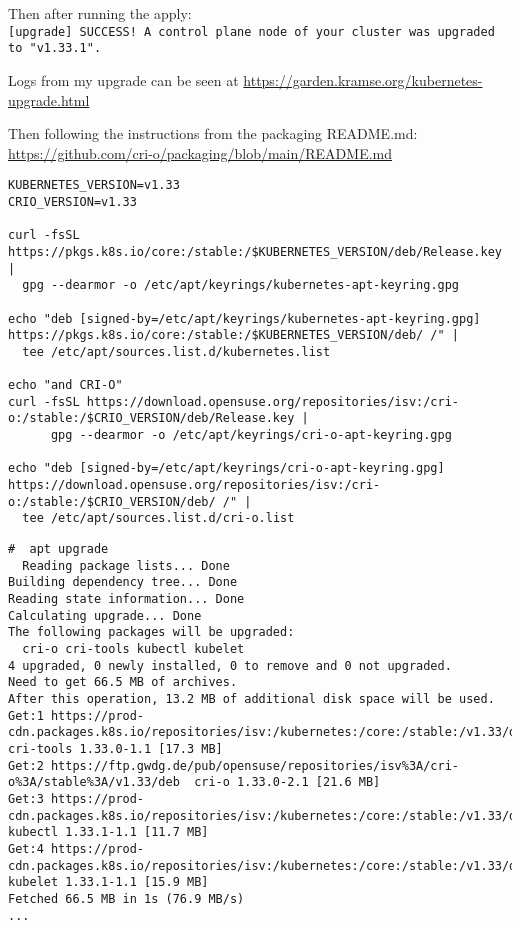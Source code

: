 \documentclass[Screen16to9,17pt]{foils}
\begin{document}
Then after running the apply:\\{\scriptsize
\verb+[upgrade] SUCCESS! A control plane node of your cluster was upgraded to "v1.33.1".+}

Logs from my upgrade can be seen at \url{https://garden.kramse.org/kubernetes-upgrade.html}


Then following the instructions from the packaging README.md:\\
\url{https://github.com/cri-o/packaging/blob/main/README.md}

\begin{verbatim}
KUBERNETES_VERSION=v1.33
CRIO_VERSION=v1.33

curl -fsSL https://pkgs.k8s.io/core:/stable:/$KUBERNETES_VERSION/deb/Release.key |
  gpg --dearmor -o /etc/apt/keyrings/kubernetes-apt-keyring.gpg

echo "deb [signed-by=/etc/apt/keyrings/kubernetes-apt-keyring.gpg]
https://pkgs.k8s.io/core:/stable:/$KUBERNETES_VERSION/deb/ /" |
  tee /etc/apt/sources.list.d/kubernetes.list

echo "and CRI-O"
curl -fsSL https://download.opensuse.org/repositories/isv:/cri-o:/stable:/$CRIO_VERSION/deb/Release.key |
      gpg --dearmor -o /etc/apt/keyrings/cri-o-apt-keyring.gpg

echo "deb [signed-by=/etc/apt/keyrings/cri-o-apt-keyring.gpg]
https://download.opensuse.org/repositories/isv:/cri-o:/stable:/$CRIO_VERSION/deb/ /" |
  tee /etc/apt/sources.list.d/cri-o.list
\end{verbatim}



\begin{verbatim}
#  apt upgrade
  Reading package lists... Done
Building dependency tree... Done
Reading state information... Done
Calculating upgrade... Done
The following packages will be upgraded:
  cri-o cri-tools kubectl kubelet
4 upgraded, 0 newly installed, 0 to remove and 0 not upgraded.
Need to get 66.5 MB of archives.
After this operation, 13.2 MB of additional disk space will be used.
Get:1 https://prod-cdn.packages.k8s.io/repositories/isv:/kubernetes:/core:/stable:/v1.33/deb  cri-tools 1.33.0-1.1 [17.3 MB]
Get:2 https://ftp.gwdg.de/pub/opensuse/repositories/isv%3A/cri-o%3A/stable%3A/v1.33/deb  cri-o 1.33.0-2.1 [21.6 MB]
Get:3 https://prod-cdn.packages.k8s.io/repositories/isv:/kubernetes:/core:/stable:/v1.33/deb  kubectl 1.33.1-1.1 [11.7 MB]
Get:4 https://prod-cdn.packages.k8s.io/repositories/isv:/kubernetes:/core:/stable:/v1.33/deb  kubelet 1.33.1-1.1 [15.9 MB]
Fetched 66.5 MB in 1s (76.9 MB/s)
...
\end{verbatim}
\end{document}
